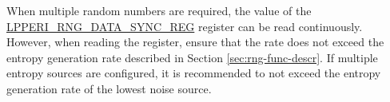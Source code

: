 \documentclass[main\_\_EN.tex]{subfiles}
\begin{document}
When multiple random numbers are required, the value of the \hyperref[regdesc:LPPERIRNGSYNCDATAREG]{LPPERI\_RNG\_DATA\_SYNC\_REG} register can be read continuously. However, when reading the register, ensure that the rate does not exceed the entropy generation rate described in Section \ref{sec:rng-func-descr}. If multiple entropy sources are configured, it is recommended to not exceed the entropy generation rate of the lowest noise source.
\end{document}
